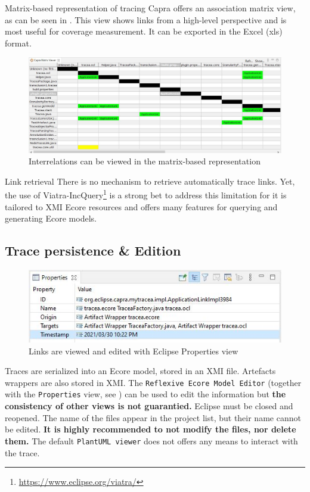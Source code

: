 \begin{descriptioncompact}
    \item[Matrix-based representation of tracing] 
Capra offers an association matrix view, as can be seen in . This view shows links from a high-level perspective and is most useful for coverage measurement. It can be exported in the Excel (xls) format.
\begin{figure}[h] 
	\centering
	\includegraphics[width=.65\linewidth]{images/matrixViewer.jpg}
	\caption{Interrelations can be viewed in the matrix-based representation}
	\label{fig:matrixviewer}
\end{figure}

    \item[Link retrieval] There is no mechanism to retrieve automatically trace links. Yet, the use of Viatra-IncQuery\footnote{\url{https://www.eclipse.org/viatra/}} is a strong bet to address this limitation for it is tailored to XMI Ecore resources and offers many features for querying and generating Ecore models.
\end{descriptioncompact}


\subsection{Trace persistence \& Edition}
\begin{figure}[h] 
	\centering
	\includegraphics[width=.65\linewidth]{images/properties.jpg}
	\caption{Links are viewed and edited with Eclipse Properties view}
	\label{fig:properties}
\end{figure}
Traces are serialized into an Ecore model, stored in an XMI file. Artefacts wrappers are also stored in XMI.
The \texttt{Reflexive Ecore Model Editor} (together with the \texttt{Properties} view, see  ) can be used to edit the information but \textbf{the consistency of other views is not guarantied.} Eclipse must be closed and reopened.
The name of the files appear in the project list, but their name cannot be edited. 
\textbf{It is highly recommended to not modify the files, nor delete them.} The default \texttt{PlantUML viewer} does not offers any means to interact with the trace.


